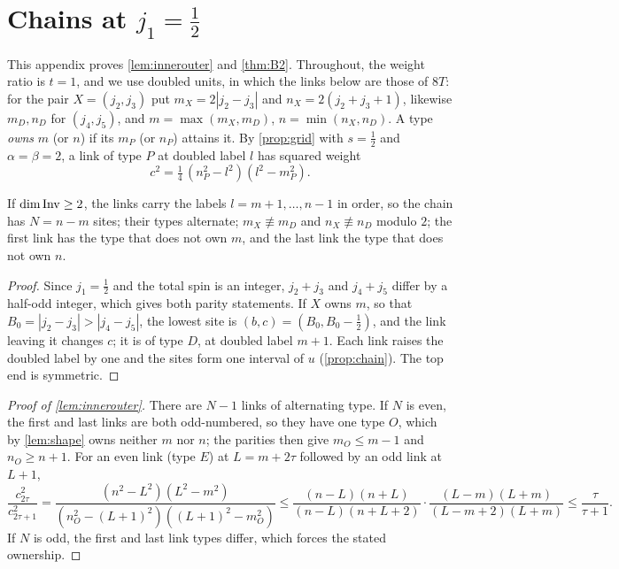 \section{Chains at \texorpdfstring{$j_1=\frac12$}{j1 = 1/2}}\label{app:chains}

This appendix proves \cref{lem:innerouter} and \cref{thm:B2}. Throughout, the weight
ratio is $t=1$, and we use doubled units, in which the links below are those of $8T$: for the pair $X=(j_2,j_3)$ put $m_X=2|j_2-j_3|$ and $n_X=2(j_2+j_3+1)$,
likewise $m_D,n_D$ for $(j_4,j_5)$, and $m=\max(m_X,m_D)$, $n=\min(n_X,n_D)$. A type
\emph{owns} $m$ (or $n$) if its $m_P$ (or $n_P$) attains it. By \cref{prop:grid} with
$s=\frac12$ and $\alpha=\beta=2$, a link of type $P$ at doubled label $l$ has squared
weight
\[
  c^2=\tfrac14\,(n_P^2-l^2)(l^2-m_P^2).
\]

\begin{lemma}\label{lem:shape}
If $\dim\operatorname{Inv}\ge2$, the links carry the labels $l=m+1,\dots,n-1$ in order, so the chain
has $N=n-m$ sites; their types alternate; $m_X\not\equiv m_D$ and $n_X\not\equiv n_D$
modulo $2$; the first link has the type that does not own $m$, and the last link the
type that does not own $n$.
\end{lemma}

\begin{proof}
Since $j_1=\frac12$ and the total spin is an integer, $j_2+j_3$ and $j_4+j_5$ differ by
a half-odd integer, which gives both parity statements. If $X$ owns $m$, so that
$B_0=|j_2-j_3|>|j_4-j_5|$, the lowest site is $(b,c)=(B_0,B_0-\frac12)$, and the link
leaving it changes $c$; it is of type $D$, at doubled label $m+1$. Each link raises the
doubled label by one and the sites form one interval of $u$ (\cref{prop:chain}). The top
end is symmetric.
\end{proof}

\begin{proof}[Proof of \cref{lem:innerouter}]
There are $N-1$ links of alternating type. If $N$ is even, the first and last links are
both odd-numbered, so they have one type $O$, which by \cref{lem:shape} owns neither $m$
nor $n$; the parities then give $m_O\le m-1$ and $n_O\ge n+1$. For an even link (type
$E$) at $L=m+2\tau$ followed by an odd link at $L+1$,
\[
  \frac{c_{2\tau}^2}{c_{2\tau+1}^2}=\frac{(n^2-L^2)(L^2-m^2)}{(n_O^2-(L+1)^2)((L+1)^2-m_O^2)}
  \le\frac{(n-L)(n+L)}{(n-L)(n+L+2)}\cdot\frac{(L-m)(L+m)}{(L-m+2)(L+m)}\le\frac{\tau}{\tau+1}.
\]
If $N$ is odd, the first and last link types differ, which forces the stated ownership.
\end{proof}


